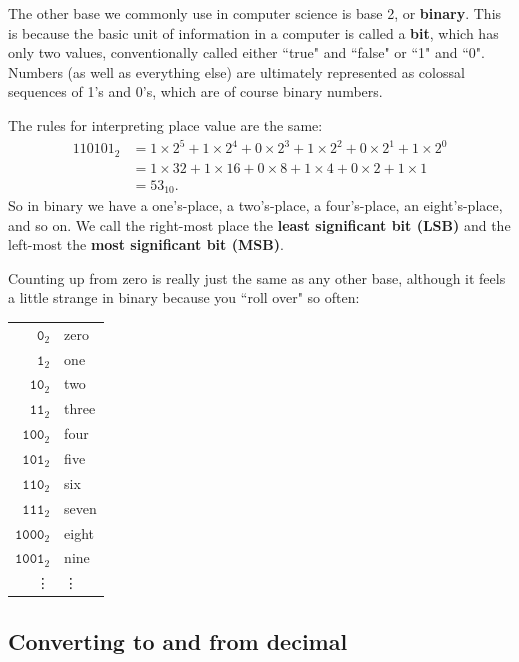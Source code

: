 The other base we commonly use in computer science is base 2, or
\textbf{binary}. This is because the basic unit of information in a
computer is called a \textbf{bit}, which has only two values,
conventionally called either ``true" and ``false" or ``1" and ``0". Numbers
(as well as everything else) are ultimately represented as colossal
sequences of 1's and 0's, which are of course binary numbers.

The rules for interpreting place value are the same:
\begin{align*}
\text{110101}_{2} &= 
1 \times 2^5 + 
1 \times 2^4 + 
0 \times 2^3 + 
1 \times 2^2 + 
0 \times 2^1 + 
1 \times 2^0 \\
&= 1 \times 32 + 
1 \times 16 + 
0 \times 8 + 
1 \times 4 + 
0 \times 2 + 
1 \times 1 \\
&= \text{53}_{10}.
\end{align*}
So in binary we have a one's-place, a two's-place, a four's-place, an
eight's-place, and so on. We call the right-most place the \textbf{least
significant bit (LSB)} and the left-most the \textbf{most significant bit
(MSB)}.

Counting up from zero is really just the same as any other base, although
it feels a little strange in binary because you ``roll over" so often:
\begin{center}
\begin{tabular}{r l}
$\texttt{0}_2$ & zero \\
$\texttt{1}_2$ & one \\
$\texttt{10}_2$ & two \\
$\texttt{11}_2$ & three \\
$\texttt{100}_2$ & four \\
$\texttt{101}_2$ & five \\
$\texttt{110}_2$ & six \\
$\texttt{111}_2$ & seven \\
$\texttt{1000}_2$ & eight \\
$\texttt{1001}_2$ & nine \\
\vdots & \vdots
\end{tabular}
\end{center}


\subsection{Converting to and from decimal}

